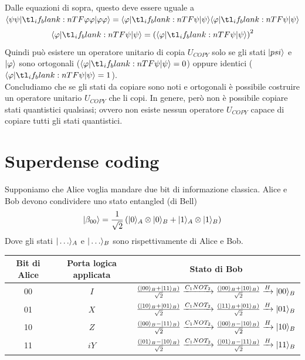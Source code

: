 \documentclass[12pt, a4paper]{report}
\begin{document}
Dalle equazioni di sopra, questo deve essere uguale a $\braket{\psi\psi}{\varphi\varphi} = \braket{\varphi}{\psi}\braket{\varphi}{\psi}$
\begin{equation*}
    \braket{\varphi}{\psi} = \left(\braket{\varphi}{\psi}\right)^{2}
\end{equation*}
Quindi può esistere un operatore unitario di copia $U_{COPY}$ solo se gli stati $| psi \rangle$ e $| \varphi \rangle$ sono ortogonali ($\braket{\varphi}{\psi} = 0$) oppure identici ($\braket{\varphi}{\psi} = 1$).\\
Concludiamo che se gli stati da copiare sono noti e ortogonali è possibile costruire un operatore unitario $U_{COPY}$ che li copi. In genere, però non è possibile copiare stati quantistici qualsiasi; ovvero non esiste nessun operatore $U_{COPY}$ capace di copiare tutti gli stati quantistici. 
\section{Superdense coding}
Supponiamo che Alice voglia mandare due bit di informazione classica. Alice e Bob devono condividere uno stato entangled (di Bell)
\begin{equation*}
    | \beta_{00} \rangle = \frac{1}{\sqrt{2}}\left(| 0 \rangle_{A}\otimes| 0 \rangle_{B}+| 1 \rangle_{A}\otimes| 1 \rangle_{B}\right)
\end{equation*}
Dove gli stati $| \ldots \rangle_{A}$ e $| \ldots \rangle_{B}$ sono rispettivamente di Alice e Bob.
\begin{center}
    \begin{tabular}{| c | c | c |}
        \hline
        \textbf{Bit di Alice} & \textbf{Porta logica applicata} & \textbf{Stato di Bob} \\
        \hline
        00 & $I$ & $\frac{\left(| 00 \rangle_{B}+| 11 \rangle_{B}\right)}{\sqrt{2}} \xrightarrow{C_{1}NOT_{2}} \frac{\left(| 00 \rangle_{B}+| 10 \rangle_{B}\right)}{\sqrt{2}} \xrightarrow{H} | 00 \rangle_{B}$ \\
        \hline
        01 & $X$ & $\frac{\left(| 10 \rangle_{B}+| 01 \rangle_{B}\right)}{\sqrt{2}} \xrightarrow{C_{1}NOT_{2}} \frac{\left(| 11 \rangle_{B}+| 01 \rangle_{B}\right)}{\sqrt{2}} \xrightarrow{H} | 01 \rangle_{B}$ \\
        \hline
        10 & $Z$ & $\frac{\left(| 00 \rangle_{B}-| 11 \rangle_{B}\right)}{\sqrt{2}} \xrightarrow{C_{1}NOT_{2}} \frac{\left(| 00 \rangle_{B}-| 10 \rangle_{B}\right)}{\sqrt{2}} \xrightarrow{H} | 10 \rangle_{B}$ \\
        \hline
        11 & $iY$ & $\frac{\left(| 01 \rangle_{B}-| 10 \rangle_{B}\right)}{\sqrt{2}} \xrightarrow{C_{1}NOT_{2}} \frac{\left(| 01 \rangle_{B}-| 11 \rangle_{B}\right)}{\sqrt{2}} \xrightarrow{H} | 11 \rangle_{B}$ \\
        \hline
    \end{tabular}
\end{center}
\end{document}

